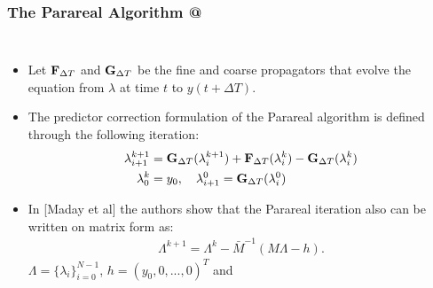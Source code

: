 \documentclass[9pt]{beamer}
\makeatletter
\newcommand*{\rom}[1]{\expandafter\@slowromancap\romannumeral #1@}
\makeatother
\begin{document}
\begin{frame}
\frametitle{The Parareal Algorithm \rom{2}}
\begin{columns}
\begin{itemize}
\item{Let $\bold{F}_{\Delta T}$ and $\bold{G}_{\Delta T}$ be the fine and coarse propagators that evolve the equation from $\lambda$ at time $t$ to $y(t+\Delta T)$.}
\item{The predictor correction formulation of the Parareal algorithm is defined through the following iteration:
{\small \begin{align*}
\lambda_{i+1}^{k+1} &= \bold{G}_{\Delta T}(\lambda_{i}^{k+1})+\bold{F}_{\Delta T}(\lambda_{i}^{k})-\bold{G}_{\Delta T}(\lambda_{i}^{k}) \\
\lambda_0^k&=y_0,\quad \lambda_{i+1}^0 = \bold{G}_{\Delta T}(\lambda_{i}^{0})
\end{align*}}}
\item{In [Maday et al] the authors show that the Parareal iteration also can be written on matrix form as:
{\small \begin{align*}
\Lambda^{k+1} = \Lambda^k -\bar M^{-1}(M\Lambda-h).
\end{align*}}
$\Lambda=\{\lambda_i\}_{i=0}^{N-1}$, $h=(y_0,0,...,0)^T$ and
}
\end{itemize}
\end{columns}
\end{frame}
\end{document}
